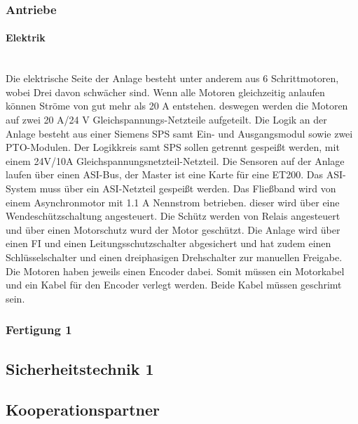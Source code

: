 \subsubsection{Antriebe}

\paragraph{Elektrik}\mbox{}\\
Die elektrische Seite der Anlage besteht unter anderem aus 6 Schrittmotoren, wobei Drei davon schwächer sind. Wenn alle Motoren gleichzeitig anlaufen können Ströme von gut mehr als 20 A entstehen. deswegen werden die Motoren auf zwei 20 A/24 V Gleichspannungs-Netzteile aufgeteilt. Die Logik an der Anlage besteht aus einer Siemens SPS samt Ein- und Ausgangsmodul sowie zwei PTO-Modulen. Der Logikkreis samt SPS sollen getrennt gespeißt werden, mit einem 24V/10A Gleichspannungsnetzteil-Netzteil. Die Sensoren auf der Anlage laufen über einen ASI-Bus, der Master ist eine Karte für eine ET200. Das ASI-System muss über ein ASI-Netzteil gespeißt werden. Das Fließband wird von einem Asynchronmotor mit 1.1 A Nennstrom betrieben. dieser wird über eine Wendeschützschaltung angesteuert. Die Schütz werden von Relais angesteuert und über einen Motorschutz wurd der Motor geschützt. Die Anlage wird über einen FI und einen Leitungsschutzschalter abgesichert und hat zudem einen Schlüsselschalter und einen dreiphasigen Drehschalter zur manuellen Freigabe.\\
Die Motoren haben jeweils einen Encoder dabei. Somit müssen ein Motorkabel und ein Kabel für den Encoder verlegt werden. Beide Kabel müssen geschrimt sein. 



\subsubsection{Fertigung 1}

\subsection{Sicherheitstechnik 1}

\subsection{Kooperationspartner}
